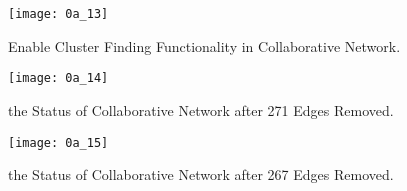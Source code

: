 \begin{figure}[!htb]
  \centering
  \texttt{[image: 0a\_13]}
  \caption{Enable Cluster Finding Functionality in Collaborative Network.}
  \label{Figure:0a_13}
\end{figure}

\begin{figure}[!htb]
  \centering
  \texttt{[image: 0a\_14]}
  \caption{the Status of Collaborative Network after 271 Edges Removed.}
  \label{Figure:0a_14}
\end{figure}

\begin{figure}[!htb]
  \centering
  \texttt{[image: 0a\_15]}
  \caption{the Status of Collaborative Network after 267 Edges Removed.}
  \label{Figure:0a_15}
\end{figure}